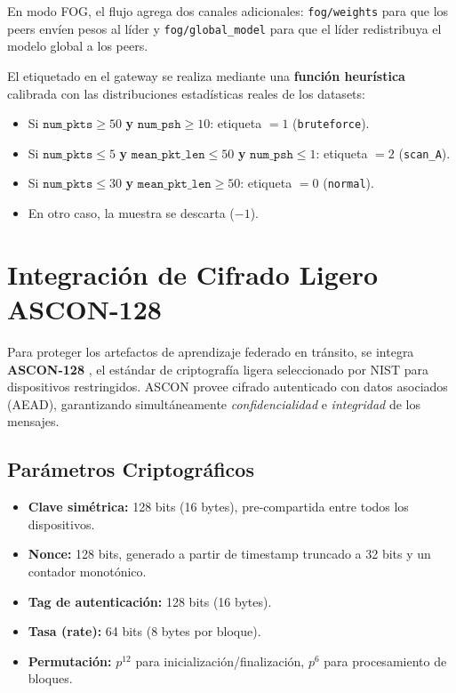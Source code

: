 En modo FOG, el flujo agrega dos canales adicionales: \texttt{fog/weights} para que los peers envíen pesos al líder y \texttt{fog/global\_model} para que el líder redistribuya el modelo global a los peers.

El etiquetado en el gateway se realiza mediante una \textbf{función heurística} calibrada con las distribuciones estadísticas reales de los datasets:

\begin{itemize}
    \item Si $\texttt{num\_pkts} \geq 50$ \textbf{y} $\texttt{num\_psh} \geq 10$: etiqueta $= 1$ (\texttt{bruteforce}).
    \item Si $\texttt{num\_pkts} \leq 5$ \textbf{y} $\texttt{mean\_pkt\_len} \leq 50$ \textbf{y} $\texttt{num\_psh} \leq 1$: etiqueta $= 2$ (\texttt{scan\_A}).
    \item Si $\texttt{num\_pkts} \leq 30$ \textbf{y} $\texttt{mean\_pkt\_len} \geq 50$: etiqueta $= 0$ (\texttt{normal}).
    \item En otro caso, la muestra se descarta ($-1$).
\end{itemize}

\section{Integración de Cifrado Ligero ASCON-128}
\label{sec:ascon}

Para proteger los artefactos de aprendizaje federado en tránsito, se integra \textbf{ASCON-128} \cite{NISTSP8002322025}, el estándar de criptografía ligera seleccionado por NIST para dispositivos restringidos. ASCON provee cifrado autenticado con datos asociados (AEAD), garantizando simultáneamente \emph{confidencialidad} e \emph{integridad} de los mensajes.

\subsection{Parámetros Criptográficos}

\begin{itemize}
    \item \textbf{Clave simétrica:} 128 bits (16 bytes), pre-compartida entre todos los dispositivos.
    \item \textbf{Nonce:} 128 bits, generado a partir de timestamp truncado a 32 bits y un contador monotónico.
    \item \textbf{Tag de autenticación:} 128 bits (16 bytes).
    \item \textbf{Tasa (rate):} 64 bits (8 bytes por bloque).
    \item \textbf{Permutación:} $p^{12}$ para inicialización/finalización, $p^6$ para procesamiento de bloques.
\end{itemize}

